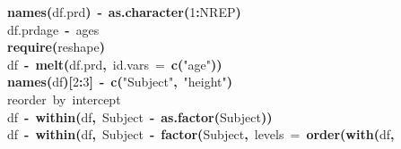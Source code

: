 \documentclass{article}
\makeatletter
\newcommand{\hlnumber}[1]{\textcolor[rgb]{0,0,0}{#1}}%
\newcommand{\hlfunctioncall}[1]{\textcolor[rgb]{.5,0,.33}{\textbf{#1}}}%
\newcommand{\hlstring}[1]{\textcolor[rgb]{.6,.6,1}{#1}}%
\newcommand{\hlkeyword}[1]{\textbf{#1}}%
\newcommand{\hlargument}[1]{\textcolor[rgb]{.69,.25,.02}{#1}}%
\newcommand{\hlcomment}[1]{\textcolor[rgb]{.18,.6,.34}{#1}}%
\newcommand{\hlassignement}[1]{\textbf{#1}}%
\newcommand{\hlsymbol}[1]{#1}%
\newcommand{\hlstd}[1]{\textcolor[rgb]{0,0,0}{#1}}%
\newenvironment{kframe}{%
 \def\FrameCommand##1{\hskip\@totalleftmargin \hskip-\fboxsep
 \colorbox{shadecolor}{##1}\hskip-\fboxsep
     \hskip-\linewidth \hskip-\@totalleftmargin \hskip\columnwidth}%
 \MakeFramed {\advance\hsize-\width
   \@totalleftmargin\z@ \linewidth\hsize
   \@setminipage}}%
 {\par\unskip\endMakeFramed}
\newenvironment{knitrout}{}{} %
\makeatother
\begin{document}
\begin{knitrout}
{\begin{kframe}
\begin{flushleft}
\hlstd{}\hlfunctioncall{names}\hlkeyword{(}\hlsymbol{df.prd}\hlkeyword{)}{\ }\hlassignement{\usebox{\hlnormalsizeboxlessthan}-}{\ }\hlfunctioncall{as.character}\hlkeyword{(}\hlnumber{1}\hlkeyword{:}\hlsymbol{NREP}\hlkeyword{)}\hspace*{\fill}\\
\hlstd{}\hlsymbol{df.prd}\hlkeyword{\usebox{\hlnormalsizeboxdollar}}\hlsymbol{age}{\ }\hlassignement{\usebox{\hlnormalsizeboxlessthan}-}{\ }\hlsymbol{ages}\hspace*{\fill}\\
\hlstd{}\hlfunctioncall{require}\hlkeyword{(}\hlsymbol{reshape}\hlkeyword{)}\hspace*{\fill}\\
\hlstd{}\hlsymbol{df}{\ }\hlassignement{\usebox{\hlnormalsizeboxlessthan}-}{\ }\hlfunctioncall{melt}\hlkeyword{(}\hlsymbol{df.prd}\hlkeyword{,}{\ }\hlargument{id.vars}{\ }\hlargument{=}{\ }\hlfunctioncall{c}\hlkeyword{(}\hlstring{"{}age"{}}\hlkeyword{)}\hlkeyword{)}\hspace*{\fill}\\
\hlstd{}\hlfunctioncall{names}\hlkeyword{(}\hlsymbol{df}\hlkeyword{)}\hlkeyword{[}\hlnumber{2}\hlkeyword{:}\hlnumber{3}\hlkeyword{]}{\ }\hlassignement{\usebox{\hlnormalsizeboxlessthan}-}{\ }\hlfunctioncall{c}\hlkeyword{(}\hlstring{"{}Subject"{}}\hlkeyword{,}{\ }\hlstring{"{}height"{}}\hlkeyword{)}\hspace*{\fill}\\
\hlstd{}\hlcomment{\usebox{\hlnormalsizeboxhash}reorder{\ }by{\ }intercept}\hspace*{\fill}\\
\hlstd{}\hlsymbol{df}{\ }\hlassignement{\usebox{\hlnormalsizeboxlessthan}-}{\ }\hlfunctioncall{within}\hlkeyword{(}\hlsymbol{df}\hlkeyword{,}{\ }\hlsymbol{Subject}{\ }\hlassignement{\usebox{\hlnormalsizeboxlessthan}-}{\ }\hlfunctioncall{as.factor}\hlkeyword{(}\hlsymbol{Subject}\hlkeyword{)}\hlkeyword{)}\hspace*{\fill}\\
\hlstd{}\hlsymbol{df}{\ }\hlassignement{\usebox{\hlnormalsizeboxlessthan}-}{\ }\hlfunctioncall{within}\hlkeyword{(}\hlsymbol{df}\hlkeyword{,}{\ }\hlsymbol{Subject}{\ }\hlassignement{\usebox{\hlnormalsizeboxlessthan}-}{\ }\hlfunctioncall{factor}\hlkeyword{(}\hlsymbol{Subject}\hlkeyword{,}{\ }\hlargument{levels}{\ }\hlargument{=}{\ }\hlfunctioncall{order}\hlkeyword{(}\hlfunctioncall{with}\hlkeyword{(}\hlsymbol{df}\hlkeyword{,}\hspace*{\fill}\\

\end{flushleft}
\end{kframe}}
\end{knitrout}
\end{document}
